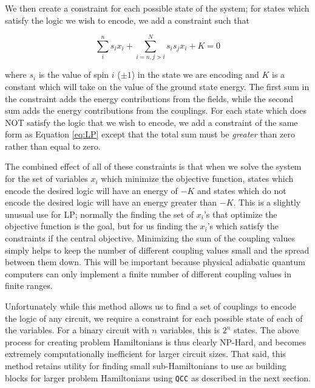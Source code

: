 We then create a constraint for each possible state of the system; for states which satisfy the logic we wish to encode, we add a constraint such that 

\begin{equation}
	\sum_i^n s_i x_i + \sum_{i=n,j > i}^N s_i s_j x_i + K = 0
	\label{eq:LP}
\end{equation} 

where $s_i$ is the value of spin $i$ ($\pm 1$) in the state we are encoding and $K$ is a constant which will take on the value of the ground state energy.  The first sum in the constraint adds the energy contributions from the fields, while the second sum adds the energy contributions from the couplings.
For each state which does NOT satisfy the logic that we wish to encode, we add a constraint of the same form as Equation \ref{eq:LP} except that the total sum must be \emph{greater} than zero rather than equal to zero.

The combined effect of all of these constraints is that when we solve the system for the set of variables $x_i$ which minimize the objective function, states which encode the desired logic will have an energy of $-K$ and states which do not encode the desired logic will have an energy greater than $-K$.
This is a slightly unusual use for LP; normally the finding the set of $x_i$'s that optimize the objective function is the goal, but for us finding the $x_i$'s which satisfy the constraints if the central objective.
Minimizing the sum of the coupling values simply helps to keep the number of different coupling values small and the spread between them down.  This will be important because physical adiabatic quantum computers can only implement a finite number of different coupling values in finite ranges. 

Unfortunately while this method allows us to find a set of couplings to encode the logic of any circuit, we require a constraint for each possible state of each of the variables.  For a binary circuit with $n$ variables, this is $2^n$ states.
The above process for creating problem Hamiltonians is thus clearly NP-Hard, and becomes extremely computationally inefficient for larger circuit sizes.
That said, this method retains utility for finding small sub-Hamiltonians to use as building blocks for larger problem Hamiltonians using \texttt{QCC} as described in the next section.


